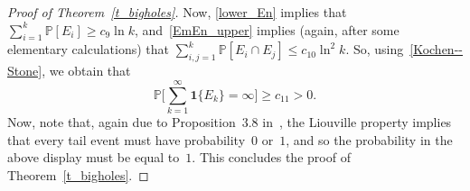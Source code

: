 \documentclass[AHL,Unicode,longabstracts]{cedram}
\newcommand{\1}[1]{{\mathbf 1}{\{#1\}}}
\newcommand{\8}{{\infty}}
\newcommand{\IP}{{\mathbb P}}
\begin{document}
\begin{proof}[Proof of Theorem~\ref{t_bigholes}]
Now, \eqref{lower_En} implies that $\sum_{i=1}^k\IP[E_i]\geq c_{9}\ln k$, and~\eqref{EmEn_upper} implies (again, after some elementary calculations) that $\sum_{i,j=1}^k\IP[E_i\cap E_j]\leq c_{10}\ln^2 k$. So, using~\eqref{Kochen--Stone}, we obtain that
\[
\IP\Big[\sum_{k=1}^\infty \1{E_k}=\infty\Big] \geq c_{11}>0.
\]
Now, note that, again due to Proposition~3.8 in~\cite[Chapter~2]{R84}, the Liouville property implies that every tail event must have probability~$0$ or~$1$, and so the probability in the above display must be equal to~$1$. This concludes the proof of Theorem~\ref{t_bigholes}.
\end{proof}


\end{document}
